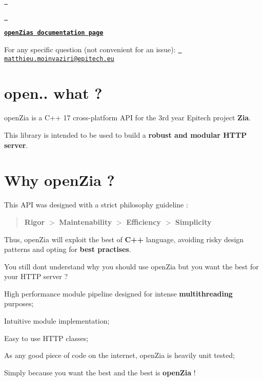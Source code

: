 \href{https://travis-ci.org/MatthieuMv/openZia}{\texttt{ }}

\href{https://codecov.io/gh/MatthieuMv/openZia}{\texttt{ }}

\href{https://matthieumv.github.io/openZia}{\texttt{ {\bfseries{open\+Zia\textquotesingle{}s documentation page}}}}

For any specific question (not convenient for an issue)\+: \href{mailto:matthieu.moinvaziri@epitech.eu}{\texttt{ matthieu.\+moinvaziri@epitech.\+eu}}

\section*{open.. what ?}

open\+Zia is a C++ 17 cross-\/platform A\+PI for the 3rd year Epitech project {\bfseries{Zia}}.

This library is intended to be used to build a {\bfseries{robust and modular H\+T\+TP server}}.

\section*{Why open\+Zia ?}

This A\+PI was designed with a strict philosophy guideline \+:

\begin{quote}
{\bfseries{Rigor}} $>$ {\bfseries{Maintenability}} $>$ {\bfseries{Efficiency}} $>$ {\bfseries{Simplicity}} \end{quote}


Thus, open\+Zia will exploit the best of {\bfseries{C++}} language, avoiding risky design patterns and opting for {\bfseries{best practises}}.

You still don\textquotesingle{}t understand why you should use open\+Zia but you want the best for your H\+T\+TP server ?
\begin{DoxyItemize}
\item High performance module pipeline designed for intense {\bfseries{multithreading}} purposes;
\item Intuitive module implementation;
\item Easy to use H\+T\+TP classes;
\item As any good piece of code on the internet, open\+Zia is heavily unit tested;
\item Simply because you want the best and the best is {\bfseries{open\+Zia}} !
\end{DoxyItemize}

